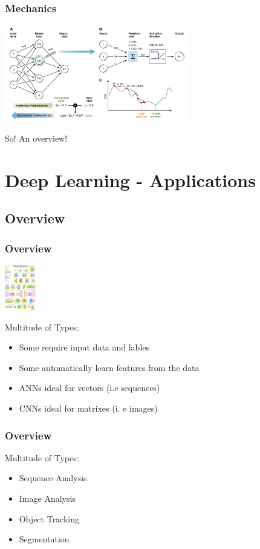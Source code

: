 \documentclass[aspectratio=169,usenames,dvipsnames]{beamer}
\begin{document}
\begin{frame}
    \frametitle{Mechanics}
    \centering
    \includegraphics[width=0.6\textwidth]{Figures/overview.png}
    \begin{block}{So! An overview!}
    \end{block}
\end{frame}

\section{Deep Learning - Applications}
\subsection{Overview}
\begin{frame}
    \frametitle{Overview}
    \centering
    \includegraphics[width=0.1\textwidth]{Figures/variants.png}
    \begin{block}{Multitude of Types:}
        \begin{itemize}
            \item Some require input data and lables
            \item Some automatically learn features from the data
            \item ANNs ideal for vectors (i.e sequences)
            \item CNNs ideal for matrixes (i. e images)
        \end{itemize}
    \end{block}
\end{frame}
\begin{frame}
    \frametitle{Overview}
    \begin{block}{Multitude of Types:}
        \begin{itemize}
            \item Sequence Analysis
            \item Image Analysis
            \item Object Tracking
            \item Segmentation
        \end{itemize}
    \end{block}
\end{frame}
\end{document}
